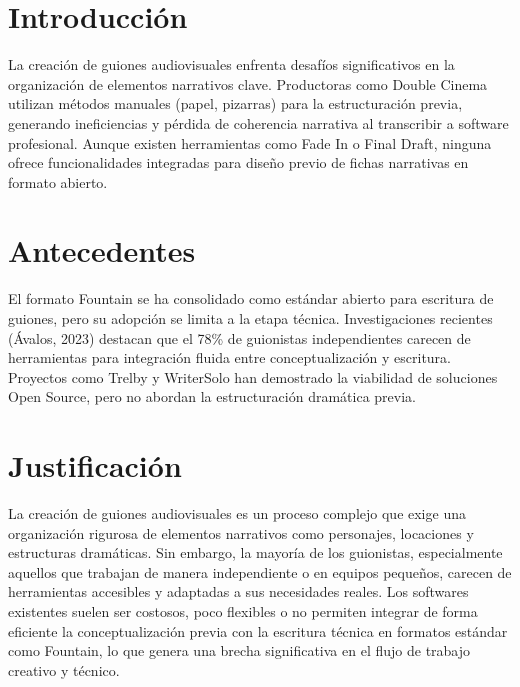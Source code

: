 \documentclass[12pt]{article}
\begin{document}
	\clearpage

	\tableofcontents
	\newpage

	\section*{Introducción}
	La creación de guiones audiovisuales enfrenta desafíos significativos en la organización de elementos narrativos clave. Productoras como Double Cinema utilizan métodos manuales (papel, pizarras) para la estructuración previa, generando ineficiencias y pérdida de coherencia narrativa al transcribir a software profesional. Aunque existen herramientas como Fade In o Final Draft, ninguna ofrece funcionalidades integradas para diseño previo de fichas narrativas en formato abierto.

	\newpage

	\section*{Antecedentes}
	El formato Fountain se ha consolidado como estándar abierto para escritura de guiones, pero su adopción se limita a la etapa técnica. Investigaciones recientes (Ávalos, 2023) destacan que el 78\% de guionistas independientes carecen de herramientas para integración fluida entre conceptualización y escritura. Proyectos como Trelby y WriterSolo han demostrado la viabilidad de soluciones Open Source, pero no abordan la estructuración dramática previa.

	\newpage

	\section*{Justificación}
	La creación de guiones audiovisuales es un proceso complejo que exige una organización rigurosa de elementos narrativos como personajes, locaciones y estructuras dramáticas. Sin embargo, la mayoría de los guionistas, especialmente aquellos que trabajan de manera independiente o en equipos pequeños, carecen de herramientas accesibles y adaptadas a sus necesidades reales. Los softwares existentes suelen ser costosos, poco flexibles o no permiten integrar de forma eficiente la conceptualización previa con la escritura técnica en formatos estándar como Fountain, lo que genera una brecha significativa en el flujo de trabajo creativo y técnico.\\
\end{document}
